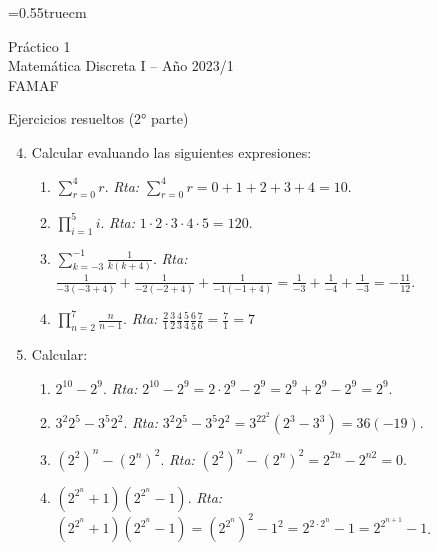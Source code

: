 \documentclass[a4paper,12pt,twoside,spanish,reqno]{amsbook}
\numberwithin{equation}{section}
\newcommand{\rta}{\noindent\textit{Rta: }}
\begin{document}
    \baselineskip=0.55truecm %
    

    
    
    {\bf \begin{center} Práctico 1 \\ Matemática Discreta I -- Año 2023/1 \\ FAMAF \end{center}}
    
    {\bf \begin{center} Ejercicios resueltos (2° parte)\end{center}}
    
    
    
    \begin{enumerate}
        \setcounter{enumi}{3}
        \setlength\itemsep{1.1em}

        
        
        \item Calcular evaluando las siguientes expresiones:
            \begin{enumerate}
                \item $\displaystyle{\sum_{r=0}^4 r}$. \quad \rta $\displaystyle{\sum_{r=0}^4 r} = 0+1+2+3+4 = 10.$
                \item \quad $\displaystyle{\prod_{i=1}^5 i}$. \quad \rta $1 \cdot  2 \cdot 3 \cdot 4\cdot  5 = 120$. 
                \item  \quad $\displaystyle{\sum_{k=-3}^{-1} \frac{1}{k(k+4)}}$. \quad \rta  $\frac{1}{-3(-3+4)} +\frac{1}{-2(-2+4)} +\frac{1}{-1(-1+4)} = \frac{1}{-3} +\frac{1}{-4} +\frac{1}{-3} = -\frac{11}{12}$.
                \item \quad $\displaystyle{\prod_{n=2}^7 \frac{n}{n-1}}$. \quad \rta $\displaystyle{\frac{2}{1}\frac{3}{2}\frac{4}{3}\frac{5}{4}\frac{6}{5}\frac{7}{6} = \frac{7}{1} = 7}$
            \end{enumerate}
        
        
        \item Calcular:
            \begin{enumerate}
                \item \quad $2^{10} - 2^{9}$. \quad  \rta $2^{10} - 2^{9} = 2\cdot 2^{9} - 2^{9} = 2^{9} + 2^{9} -2^{9} = 2^{9}$.
                \item \quad $3^2 2^5 - 3^5 2^2$. \quad  \rta $3^2 2^5 - 3^5 2^2 = 3^22^2(2^3 -3^3) = 36 (-19)$.
                \item \quad $(2^2)^n - (2^n)^2$. \quad  \rta $(2^2)^n - (2^n)^2 = 2^{2n} - 2^{n2} =0$.
                \item \quad $(2^{2^n} + 1)  (2^{2^n} - 1)$. \quad  \rta $(2^{2^n} + 1)  (2^{2^n} - 1) = {(2^{2^n})}^2 -1^2 = 2^{2 \cdot 2^n} - 1 = 2^{2^{n+1}} - 1$.
            \end{enumerate}
        

\end{enumerate}
\end{document}
